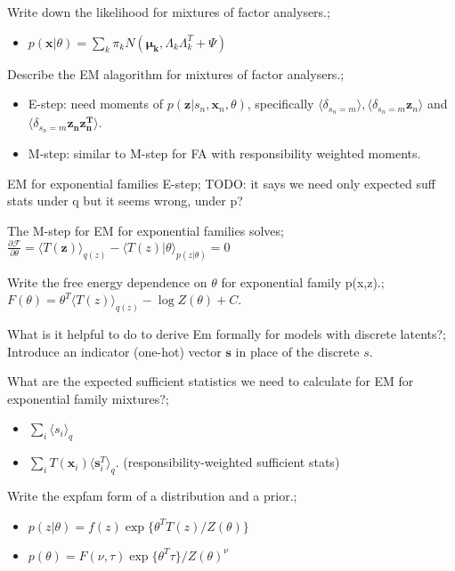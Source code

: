 \documentclass{article}
\begin{document}
Write down the likelihood for mixtures of factor analysers.; \begin{itemize}
    \item $p(\mathbf{x}|\theta) = \sum_k \pi_k N(\mathbf{\mu_k}, \Lambda_k\Lambda_k^T + \Psi)$
\end{itemize}

Describe the EM alagorithm for mixtures of factor analysers.; \begin{itemize}
    \item E-step: need moments of $p(\mathbf{z}|s_n, \mathbf{x}_n, \theta)$, specifically $\langle \delta_{s_n=m}\rangle, \langle\delta_{s_n=m}\mathbf{z}_n\rangle$ and $\langle \delta_{s_n=m}\mathbf{z_nz_n^T}\rangle$.
    \item M-step: similar to M-step for FA with responsibility weighted moments.
\end{itemize}

EM for exponential families E-step; TODO: it says we need only expected suff stats under q but it seems wrong, under p?

The M-step for EM for exponential families solves; $\frac{\partial \mathcal{F}}{\partial \theta}= \langle T(\mathbf{z})\rangle_{q(z)} - \langle T(z)|\theta \rangle_{p(z|\theta)} = 0$

Write the free energy dependence on $\theta$ for exponential family p(x,z).; $F(\theta) = \theta^T\langle T(z) \rangle_{q(z)} - \log Z(\theta) + C$.

What is it helpful to do to derive Em formally for models with discrete latents?; Introduce an indicator (one-hot) vector $\mathbf{s}$ in place of the discrete $s$.

What are the expected sufficient statistics we need to calculate for EM for exponential family mixtures?; \begin{itemize}
    \item $\sum_i \langle s_i \rangle_{q}$
    \item $\sum_i T(\mathbf{x}_i)\langle \mathbf{s}_i^T \rangle_q$. (responsibility-weighted sufficient stats)
\end{itemize}

Write the expfam form of a distribution and a prior.; \begin{itemize}
    \item $p(z|\theta) = f(z)\exp\{\theta^T T(z)/Z(\theta)\}$
    \item $p(\theta) = F(\nu, \tau)\exp\{\theta^T\tau\}/Z(\theta)^\nu$
\end{itemize}
\end{document}
